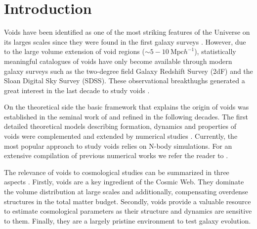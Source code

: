 \documentclass[a4,useAMS,usenatbib,usegraphicx]{mn2e}
\begin{document}
\section{Introduction}
\label{sec:introduction}

Voids have been identified as one of the most striking features of the
Universe on its larges scales since they were found in the first
galaxy surveys \citep{Chincarini75, Gregory78, Einasto80M, Einasto80N,
  Kirshner81, Zeldovich82,Kirshner87}.  
However, due to the large volume extension of void regions ($\sim
5-10\ \mbox{Mpc}  h^{-1}$), statistically meaningful catalogues of
voids \citep{Pan10,  Sutter12b, Nadathur14} have only become available
through modern galaxy surveys such as the two-degree field Galaxy
Redshift Survey (2dF) \citep{ Colless01, Colless03} and the Sloan
Digital Sky Survey (SDSS)\citep{York00, Abazajian03}.
These observational breakthughs generated a great interest in the last
decade to study voids \citep{Hoyle04, Croton04, Rojas05,
  Ceccarelli06, Patiri06a, Tikhonov06, Patiri06b,Tikhonov07,
  BendaBeckmann08, Foster09, Ceccarelli13, Sutter14a}. 


On the theoretical side the basic framework that explains
the origin of voids was established in the seminal work of
\citet{Zeldovich70} and refined in the following decades.  
The first detailed theoretical models describing formation, dynamics
and properties of  voids \citep{Hoffman82, Icke84, Bertschinger85,
  Blumenthal92} were  complemented and extended by numerical studies
\citep{Martel90, Regos91, Weygaert93, Dubinski93, Bond96}. 
Currently, the most popular approach to study voids relies on N-body
simulations. For an extensive compilation of previous  
numerical works we refer the reader to \citet{Colberg08}.


The relevance of voids to cosmological studies can be summarized in
three aspects \citep{Platen07}. 
Firstly, voids are a key ingredient of the Cosmic Web. 
They dominate the volume distribution at large scales and
additionally, compensating overdense structures in the total matter
budget. 
Secondly, voids provide a valuable resource to estimate  
cosmological parameters as their structure and dynamics are sensitive
to them. 
Finally, they are a largely pristine environment to test galaxy
evolution. 
\end{document}
